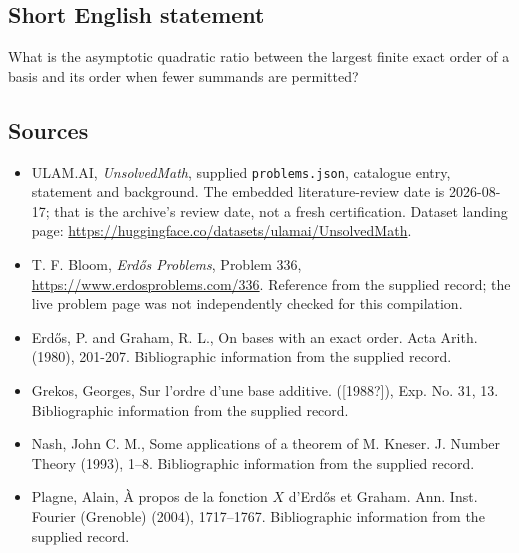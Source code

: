 \documentclass[11pt,a4paper]{article}
\begin{document}
\subsection{Short English statement}

What is the asymptotic quadratic ratio between the largest finite exact order of a basis and its order when fewer summands are permitted?

\subsection{Sources}

{\small

\begin{itemize}

\item[\hypertarget{source:statement:1}{S1}] ULAM.AI, \emph{UnsolvedMath}, supplied \texttt{problems.json}, catalogue entry, statement and background. The embedded literature-review date is 2026-08-17; that is the archive’s review date, not a fresh certification. Dataset landing page: \url{https://huggingface.co/datasets/ulamai/UnsolvedMath}.

\item[\hypertarget{source:statement:2}{S2}] T. F. Bloom, \emph{Erdős Problems}, Problem 336, \url{https://www.erdosproblems.com/336}. Reference from the supplied record; the live problem page was not independently checked for this compilation.

\item[\hypertarget{source:statement:3}{S3}] Erd\H{o}s, P. and Graham, R. L., On bases with an exact order. Acta Arith. (1980), 201-207. Bibliographic information from the supplied record.

\item[\hypertarget{source:statement:4}{S4}] Grekos, Georges, Sur l'ordre d'une base additive. ([1988?]), Exp. No. 31, 13. Bibliographic information from the supplied record.

\item[\hypertarget{source:statement:5}{S5}] Nash, John C. M., Some applications of a theorem of {M}. {K}neser. J. Number Theory (1993), 1--8. Bibliographic information from the supplied record.

\item[\hypertarget{source:statement:6}{S6}] Plagne, Alain, \`A{} propos de la fonction {$X$} d'{E}rd\H{o}s et {G}raham. Ann. Inst. Fourier (Grenoble) (2004), 1717--1767. Bibliographic information from the supplied record.

\end{itemize}

}

\label{end:statement}
\end{document}
